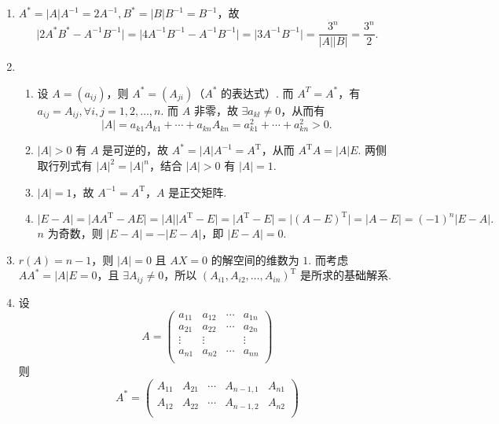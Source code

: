 \begin{enumerate}
    \item $A^* = \lvert A \rvert A^{-1} = 2A^{-1}, B^* = \lvert B \rvert B^{-1} = B^{-1}$，故 \[\lvert 2A^*B^*-A^{-1}B^{-1} \rvert = \lvert 4A^{-1}B^{-1}-A^{-1}B^{-1} \rvert = \lvert 3A^{-1}B^{-1} \rvert = \dfrac{3^n}{\lvert A \rvert \lvert B \rvert} = \dfrac{3^n}{2}.\]
    \item \begin{enumerate}
        \item 设 $A = (a_{ij})$，则 $A^* = (A_{ji})$（$A^*$ 的表达式）. 而 $A^T = A^*$，有 $a_{ij} = A_{ij}, \forall i, j = 1, 2, \ldots, n$. 而 $A$ 非零，故 $\exists a_{kl} \neq 0$，从而有 \[ \lvert A \rvert = a_{k1}A_{k1}+\cdots+a_{kn}A_{kn} = a_{k1}^2+\cdots+a_{kn}^2 > 0.\]
        \item $\lvert A \rvert > 0$ 有 $A$ 是可逆的，故 $A^* = \lvert A \rvert A^{-1} = A^{\mathrm{T}}$，从而 $A^{\mathrm{T}}A = \lvert A \rvert E$. 两侧取行列式有 $\lvert A \rvert^2 = \lvert A \rvert^n $，结合 $\lvert A \rvert > 0$ 有 $\lvert A \rvert = 1$.
        \item $\lvert A \rvert = 1$，故 $A^{-1} = A^{\mathrm{T}}$，$A$ 是正交矩阵.
        \item \[\lvert E-A \rvert = \lvert AA^{\mathrm{T}}-AE \rvert = \lvert A \rvert \lvert A^{\mathrm{T}}-E\rvert = \lvert A^{\mathrm{T}}-E\rvert = \lvert (A-E)^{\mathrm{T}} \rvert = \lvert A-E \rvert = (-1)^n\lvert E-A \rvert.\]
        $n$ 为奇数，则 $\lvert E-A \rvert = -\lvert E-A \rvert$，即 $\lvert E-A \rvert = 0$.
    \end{enumerate}
    \item $r(A) = n-1$，则 $\lvert A \rvert = 0$ 且 $AX = 0$ 的解空间的维数为 $1$. 而考虑 $AA^* = \lvert A \rvert E = 0$，且 $\exists A_{ij} \neq 0$，所以 $(A_{i1}, A_{i2}, \ldots , A_{in})^{\mathrm{T}}$ 是所求的基础解系.
    \item 设 \[A = \begin{pmatrix}
        a_{11} & a_{12} & \cdots & a_{1n} \\
        a_{21} & a_{22} & \cdots & a_{2n} \\
        \vdots & \vdots &        & \vdots \\
        a_{n1} & a_{n2} & \cdots & a_{nn} \\
    \end{pmatrix}\]
    则 \[A^* = \begin{pmatrix}
        A_{11} & A_{21} & \cdots & A_{n-1, 1} & A_{n1} \\
        A_{12} & A_{22} & \cdots & A_{n-1, 2} & A_{n2} \\

\end{pmatrix}\]
\end{enumerate}
